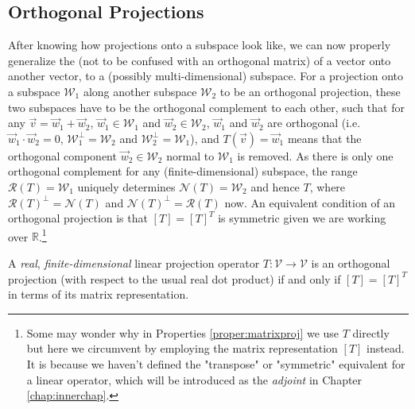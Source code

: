 \subsection{Orthogonal Projections}
\label{subsection:orthoproj}

After knowing how projections onto a subspace look like, we can now properly generalize the  (not to be confused with an orthogonal matrix) of a vector onto another vector, to a (possibly multi-dimensional) subspace. For a projection onto a subspace $\mathcal{W}_1$ along another subspace $\mathcal{W}_2$ to be an orthogonal projection, these two subspaces have to be the orthogonal complement to each other, such that for any $\vec{v} = \vec{w}_1 + \vec{w}_2$, $\vec{w}_1 \in \mathcal{W}_1$ and $\vec{w}_2 \in \mathcal{W}_2$, $\vec{w}_1$ and $\vec{w}_2$ are orthogonal (i.e.\ $\vec{w}_1 \cdot \vec{w}_2 = 0$, $\mathcal{W}_1^\perp = \mathcal{W}_2$ and $\mathcal{W}_2^\perp = \mathcal{W}_1$), and $T(\vec{v}) = \vec{w}_1$ means that the orthogonal component $\vec{w}_2 \in \mathcal{W}_2$ normal to $\mathcal{W}_1$ is removed. As there is only one orthogonal complement for any (finite-dimensional) subspace, the range $\mathcal{R}(T) = \mathcal{W}_1$ uniquely determines $\mathcal{N}(T) = \mathcal{W}_2$ and hence $T$, where $\mathcal{R}(T)^\perp = \mathcal{N}(T)$ and $\mathcal{N}(T)^\perp = \mathcal{R}(T)$ now. An equivalent condition of an orthogonal projection is that $[T] = [T]^T$ is symmetric given we are working over $\mathbb{R}$.\footnote{Some may wonder why in Properties \ref{proper:matrixproj} we use $T$ directly but here we circumvent by employing the matrix representation $[T]$ instead. It is because we haven't defined the "transpose" or "symmetric" equivalent for a linear operator, which will be introduced as the \textit{adjoint} in Chapter \ref{chap:innerchap}.}
\begin{proper}
\label{proper:orthogonalproj}
A \textit{real}, \textit{finite-dimensional} linear projection operator $T: \mathcal{V} \to \mathcal{V}$ is an orthogonal projection (with respect to the usual real dot product) if and only if $[T] = [T]^T$ in terms of its matrix representation.  
\end{proper}
